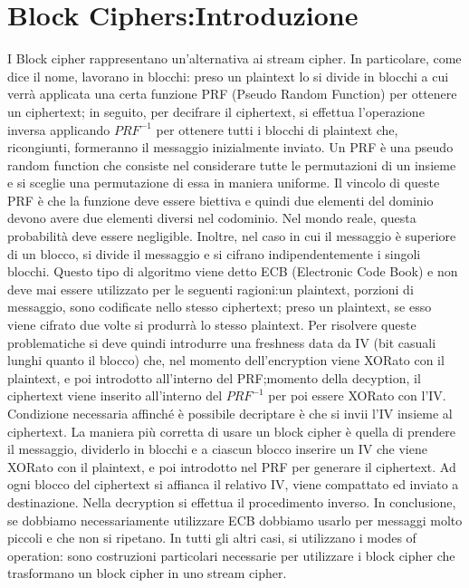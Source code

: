 \documentclass[a4paper,draft]{article}
\begin{document}
\section{Block Ciphers:Introduzione}
I Block cipher rappresentano un'alternativa ai stream cipher. In particolare, come dice il nome, lavorano in blocchi: preso un plaintext lo si divide in blocchi a cui verrà applicata una certa funzione PRF (Pseudo Random Function) per ottenere un ciphertext; in seguito, per decifrare il ciphertext, si effettua l'operazione inversa applicando \(PRF^{-1}\) per ottenere tutti i blocchi di plaintext che, ricongiunti, formeranno il messaggio inizialmente inviato\@.
Un PRF è una pseudo random function che consiste nel considerare tutte le permutazioni di un insieme e si sceglie una permutazione di essa in maniera uniforme\@.
Il vincolo di queste PRF è che la funzione deve essere biettiva e quindi due elementi del dominio devono avere due elementi diversi nel codominio. Nel mondo reale, questa probabilità deve essere negligible\@.
Inoltre, nel caso in cui il messaggio è superiore di un blocco, si divide il messaggio e si cifrano indipendentemente i singoli blocchi. Questo tipo di algoritmo viene detto ECB (Electronic Code Book) e non deve mai essere utilizzato per le seguenti ragioni:\@preso un plaintext, porzioni di messaggio, sono codificate nello stesso ciphertext; preso un plaintext, se esso viene cifrato due volte si produrrà lo stesso plaintext\@.
Per risolvere queste problematiche si deve quindi introdurre una freshness data da IV (bit casuali lunghi quanto il blocco) che, nel momento dell'encryption viene XORato con il plaintext, e poi introdotto all'interno del PRF;\@nel momento della decyption, il ciphertext viene inserito all'interno del \(PRF^{-1}\) per poi essere XORato con l'IV\@. Condizione necessaria affinché è possibile decriptare è che si invii l'IV insieme al ciphertext\@.\newline
La maniera più corretta di usare un block cipher è quella di prendere il messaggio, dividerlo in blocchi e a ciascun blocco inserire un IV che viene XORato con il plaintext, e poi introdotto nel PRF per generare il ciphertext. Ad ogni blocco del ciphertext si affianca il relativo IV, viene compattato ed inviato a destinazione\@. Nella decryption si effettua il procedimento inverso\@.\newline
In conclusione, se dobbiamo necessariamente utilizzare ECB dobbiamo usarlo per messaggi molto piccoli e che non si ripetano\@. In tutti gli altri casi, si utilizzano i modes of operation: sono costruzioni particolari necessarie per utilizzare i block cipher che trasformano un block cipher in uno stream cipher.
\end{document}
